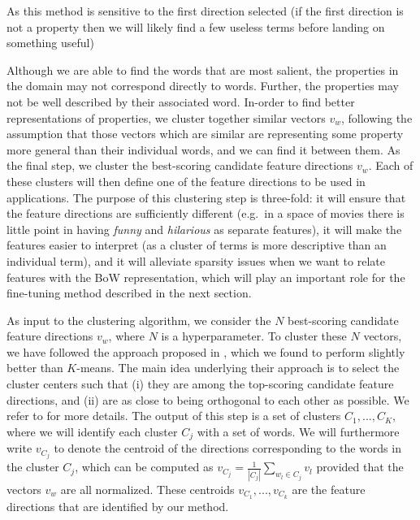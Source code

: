 As this method is sensitive to the first direction selected (if the first direction is not a property then we will likely find a few useless terms before landing on something useful) %

Although we are able to find the words that are most salient, the properties in the domain may not correspond directly to words. Further, the properties may not be well described by their associated word. In-order to find better representations of properties, we cluster together similar vectors $v_w$, following the assumption that those vectors which are similar are representing some property more general than their individual words, and we can find it between them.
As the final step, we cluster the best-scoring candidate feature directions $v_w$. Each of these clusters will then define one of the feature directions to be used in applications. The purpose of this clustering step is three-fold: it will ensure that the feature directions are sufficiently different (e.g.\ in a space of movies there is little point in having \emph{funny} and \emph{hilarious} as separate features), it will make the features easier to interpret (as a cluster of terms is more descriptive than an individual term), and it will alleviate sparsity issues when we want to relate features with the BoW representation, which will play an important role for the fine-tuning method described in the next section.

As input to the clustering algorithm, we consider the $N$ best-scoring candidate feature directions $v_w$, where $N$ is a hyperparameter. To cluster these $N$ vectors, we have followed the approach proposed in \cite{derracAIJ}, which we found to perform slightly better than $K$-means. The main idea underlying their approach is to select the cluster centers such that (i) they are among the top-scoring candidate feature directions, and (ii) are as close to being orthogonal to each other as possible. We refer to \cite{derracAIJ} for more details. 
The output of this step is a set of clusters $C_1,...,C_K$, where we will identify each cluster $C_j$ with a set of words.
We will furthermore write $v_{C_j}$ to denote the centroid of the directions corresponding to the words in the cluster $C_j$, which can be computed as $v_{C_j}= \frac{1}{|C_j|} \sum_{w_l\in C_j} v_l$ provided that the vectors $v_w$ are all normalized. These centroids $v_{C_1},...,v_{C_k}$ are the feature directions that are identified by our method. 

